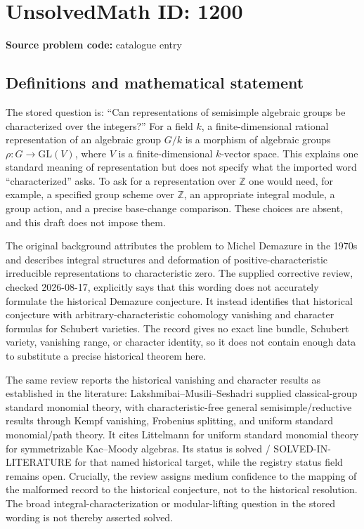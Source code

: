\documentclass[11pt]{article}
\newcommand{\Z}{\mathbb{Z}}
\begin{document}
\section*{UnsolvedMath ID: 1200}
\textbf{Source problem code:} catalogue entry
\subsection{Definitions and mathematical statement}
The stored question is: ``Can representations of semisimple algebraic groups be characterized over the integers?'' For a field $k$, a finite-dimensional rational representation of an algebraic group $G/k$ is a morphism of algebraic groups $\rho:G\to\mathrm{GL}(V)$, where $V$ is a finite-dimensional $k$-vector space. This explains one standard meaning of representation but does not specify what the imported word ``characterized'' asks. To ask for a representation over $\Z$ one would need, for example, a specified group scheme over $\Z$, an appropriate integral module, a group action, and a precise base-change comparison. These choices are absent, and this draft does not impose them.

The original background attributes the problem to Michel Demazure in the 1970s and describes integral structures and deformation of positive-characteristic irreducible representations to characteristic zero. The supplied corrective review, checked 2026-08-17, explicitly says that this wording does not accurately formulate the historical Demazure conjecture. It instead identifies that historical conjecture with arbitrary-characteristic cohomology vanishing and character formulas for Schubert varieties. The record gives no exact line bundle, Schubert variety, vanishing range, or character identity, so it does not contain enough data to substitute a precise historical theorem here.

The same review reports the historical vanishing and character results as established in the literature: Lakshmibai--Musili--Seshadri supplied classical-group standard monomial theory, with characteristic-free general semisimple/reductive results through Kempf vanishing, Frobenius splitting, and uniform standard monomial/path theory. It cites Littelmann for uniform standard monomial theory for symmetrizable Kac--Moody algebras. Its status is solved / SOLVED-IN-LITERATURE for that named historical target, while the registry status field remains open. Crucially, the review assigns medium confidence to the mapping of the malformed record to the historical conjecture, not to the historical resolution. The broad integral-characterization or modular-lifting question in the stored wording is not thereby asserted solved.
\end{document}
